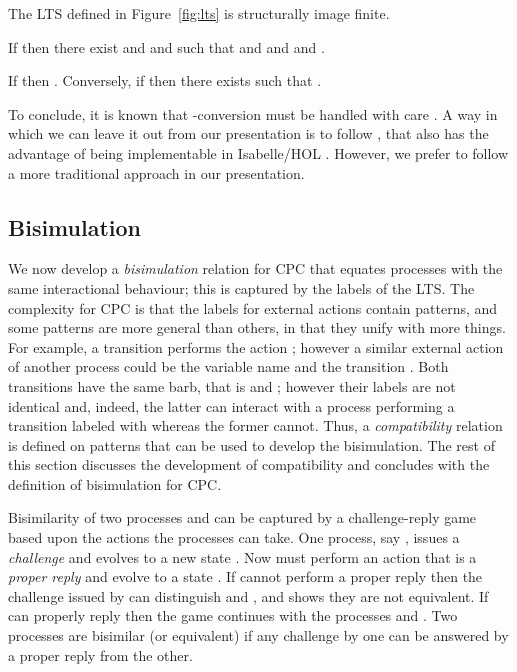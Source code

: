 \documentclass{LMCS}
\begin{document}
\begin{prop}
\label{prop:imfin}
The LTS defined in Figure~\ref{fig:lts} is structurally image finite.
\end{prop}


\begin{lem}
\label{lem:lts-exhibit-p}
If  then 
there exist  and  and  such that 
 and
 and
 and .
\end{lem}

\begin{prop}
\label{prop:tau-red}
If  then .
Conversely, if  then there exists  such that .
\end{prop}

To conclude, it is known that -conversion must be handled with care \cite{UBN07}.
A way in which we can leave it out from our presentation is to follow \cite{BP09}, that
also has the advantage of being implementable in Isabelle/HOL \cite{NPW02}.
However, we prefer to follow a more traditional approach in our presentation.


\subsection{Bisimulation}
\label{sec:bis}

We now develop a {\em bisimulation} relation for CPC that equates processes with the same interactional behaviour; this is captured by the labels of the LTS.
The complexity for CPC is that the labels for external actions contain patterns, and some patterns are more general than others, in that they unify with more things. 
For example, a transition  performs the action ; however a similar external action of another process could be the variable name  and the transition .
Both transitions have the same barb, that is  and ; however their labels are not identical
and, indeed, the latter can interact with a process performing a transition labeled with  whereas the former cannot.
Thus, a {\em compatibility} relation is defined on patterns that can be used to develop the bisimulation.
The rest of this section discusses the development of compatibility and concludes with the definition of bisimulation for CPC.

Bisimilarity of two processes  and  can be captured by a challenge-reply game 
based upon the actions the processes can take.
One process, say , issues a {\em challenge} and evolves to a new state .
Now  must perform an action that is a {\em proper reply} and evolve to a state .
If  cannot perform a proper reply then the challenge issued by  can distinguish  and , 
and shows they are not equivalent.
If  can properly reply then the game continues with the processes  and .
Two processes are bisimilar (or equivalent) if any challenge by one
can be answered by a proper reply from the other. 
\end{document}
